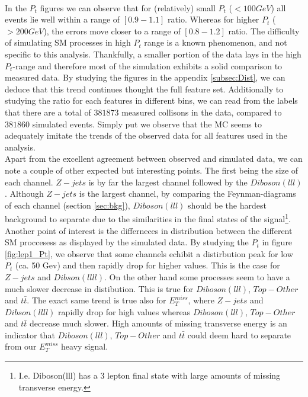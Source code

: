 \\
In the $P_t$ figures we can observe that for (relatively) small $P_t$ ($<100GeV$) all events lie well within a range of $[0.9-1.1]$ ratio. 
Whereas for higher $P_t$ ($>200GeV$), the errors move closer to a range of $[0.8-1.2]$ ratio. The difficulty of simulating \ac{SM} processes 
in high $P_t$ range is a known phenomenon, and not specific to this analysis. Thankfully, a smaller portion of the data lays in the high $P_t$-range
and therefore most of the simulation exhibits a solid comparison to measured data. By studying the figures in the appendix \ref{subsec:Dist}, 
we can deduce that this trend continues thought the full feature set. Additionally to studying the ratio for each features in different bins,
we can read from the labels that there are a total of $381873$ measured collisons in the data, compared to $381860$ simulated events.
Simply put we observe that the \ac{MC} seems to adequately imitate the trends of the observed data for all features used in the analysis. 
\\
Apart from the excellent agreement between observed and simulated data, we can note a couple of other expected
but interesting points. The first being the size of each channel. $Z-jets$ is by far the largest channel followed
by the $Diboson (lll)$. Although $Z-jets$ is the largest channel, by comparing the Feynman-diagrams of each channel
(section \ref{sec:bkg}), $Diboson(lll)$ should be the hardest background to separate due to the similarities in the 
final states of the signal\footnote{I.e. Diboson(lll) has a 3 lepton final state with large amounts of missing transverse energy.}. Another 
point of interest is the differneces in distribution between the different \ac{SM} proccesess as displayed by the 
simulated data. By studying the $P_t$ in figure \ref{fig:lep1_Pt}, we observe that some channels echibit a distirbution  
peak for low $P_t$ (ca. 50 Gev) and then rapidly drop for higher values. This is the case for $Z-jets$ and $Dibson (llll)$.
On the other hand some processes seem to have a much slower decrease in distibution. This is true for $Diboson(lll)$, $Top-Other$
and $t\bar{t}$. The exact same trend is true also for $E_T^{miss}$, where $Z-jets$ and $Dibson (llll)$ rapidly drop for high values 
whereas $Diboson(lll)$, $Top-Other$ and $t\bar{t}$ decrease much slower. High amounts of missing transverse energy is an indicator that 
$Diboson(lll)$, $Top-Other$ and $t\bar{t}$  could deem hard to separate from our $E_T^{miss}$ heavy signal.
